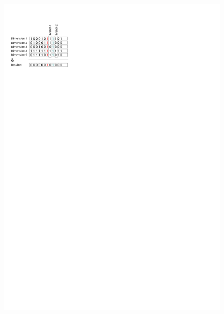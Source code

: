 \documentclass[xcolor=x11names,compress]{beamer}
\renewcommand{\(}{\begin{columns}}
\renewcommand{\)}{\end{columns}}
\newcommand{\<}[1]{\begin{column}{#1}}
\renewcommand{\>}{\end{column}}
\begin{document}
\begin{frame}
  \begin{figure}
  \centering
  \includegraphics[height=0.7\textheight]{figures/matching}
  \end{figure}
\end{frame}
\end{document}
